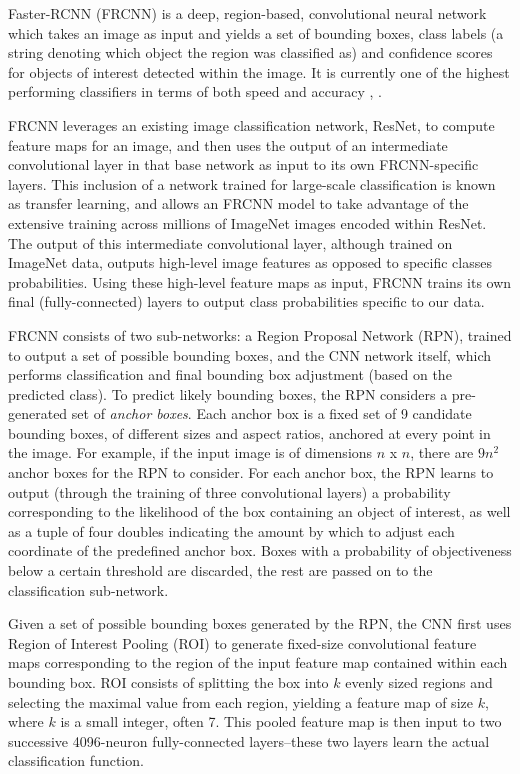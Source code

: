 Faster-RCNN (FRCNN) is a deep, region-based, convolutional neural network which takes an image as input and yields a set of bounding boxes, class labels (a string denoting which object the region was classified as) and confidence scores for objects of interest detected within the image\cite{ren2015faster}. It is currently one of the highest performing classifiers in terms of both speed and accuracy \cite{russakovsky2015imagenet}, \cite{ren2015faster}. 

FRCNN leverages an existing image classification network, ResNet, to compute feature maps for an image, and then uses the output of an intermediate convolutional layer in that base network as input to its own FRCNN-specific layers. This inclusion of a network trained for large-scale classification is known as transfer learning, and allows an FRCNN model to take advantage of the extensive training across millions of ImageNet images encoded within ResNet. The output of this intermediate convolutional layer, although trained on ImageNet data, outputs high-level image features as opposed to specific classes probabilities. Using these high-level feature maps as input, FRCNN trains its own final (fully-connected) layers to output class probabilities specific to our data.

FRCNN consists of two sub-networks: a Region Proposal Network (RPN), trained to output a set of possible bounding boxes, and the CNN network itself, which performs classification and final bounding box adjustment (based on the predicted class). To predict likely bounding boxes, the RPN considers a pre-generated set of \textit{anchor boxes}. Each anchor box is a fixed set of 9 candidate bounding boxes, of different sizes and aspect ratios, anchored at every point in the image. For example, if the input image is of dimensions $n$ x $n$, there are $9n^2$ anchor boxes for the RPN to consider. For each anchor box, the RPN learns to output (through the training of three convolutional layers) a probability corresponding to the likelihood of the box containing an object of interest, as well as a tuple of four doubles indicating the amount by which to adjust each coordinate of the predefined anchor box. Boxes with a probability of objectiveness below a certain threshold are discarded, the rest are passed on to the classification sub-network.

Given a set of possible bounding boxes generated by the RPN, the CNN first uses Region of Interest Pooling (ROI) to generate fixed-size convolutional feature maps corresponding to the region of the input feature map contained within each bounding box. ROI consists of splitting the box into $k$ evenly sized regions and selecting the maximal value from each region, yielding a feature map of size $k$, where $k$ is a small integer, often 7. This pooled feature map is then input to two successive 4096-neuron fully-connected layers--these two layers learn the actual classification function. 

